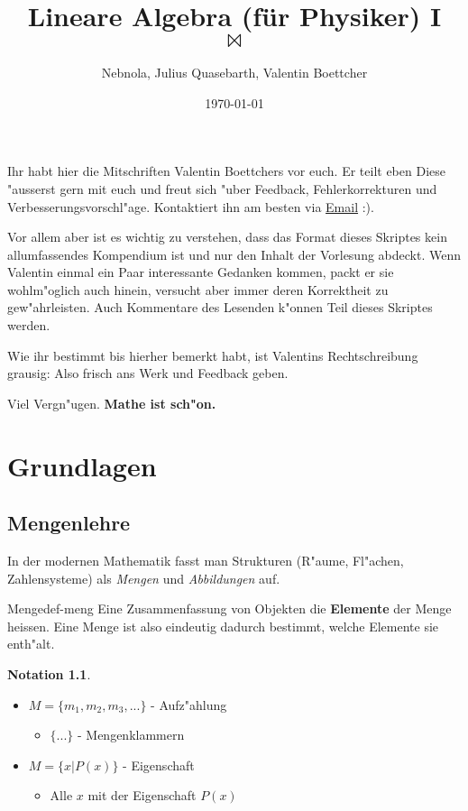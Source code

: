 \documentclass[oneside,fontsize=11pt,paper=a4,BCOR=0mm,DIV=12,automark,headsepline]{scrbook}
\author{Nebnola, Julius Quasebarth, Valentin Boettcher}
\date{\today}
\title{Lineare Algebra (für Physiker) I \\$\bowtie$}
\theoremstyle{remark}
\theoremstyle{definition}
\newtheorem*{notation}{Notation}
\theoremstyle{definition}
\theoremstyle{remark}
\begin{document}
\maketitle
\tableofcontents
\newpage
Ihr habt hier die Mitschriften Valentin Boettchers vor euch. Er teilt eben Diese
"ausserst gern mit euch und freut sich "uber Feedback, Fehlerkorrekturen und
Verbesserungsvorschl"age. Kontaktiert ihn am besten via \href{mailto:valentin.boettcher@mailbox.tu-dresden.de}{Email} :).

Vor allem aber ist es wichtig zu verstehen, dass das Format dieses Skriptes
kein allumfassendes Kompendium ist und nur den Inhalt der Vorlesung abdeckt.
Wenn Valentin einmal ein Paar interessante Gedanken kommen, packt er sie
wohlm"oglich auch hinein, versucht aber immer deren Korrektheit zu
gew"ahrleisten. Auch Kommentare des Lesenden k"onnen Teil dieses Skriptes
werden.

Wie ihr bestimmt bis hierher bemerkt habt, ist Valentins Rechtschreibung
grausig: Also frisch ans Werk und Feedback geben.


Viel Vergn"ugen. \textbf{Mathe ist sch"on.}

\part{Grundlagen}
\chapter{Mengenlehre}
\label{sec:orgd4be270}
In der modernen Mathematik fasst man Strukturen (R"aume, Fl"achen,
Zahlensysteme) als \emph{Mengen} und \emph{Abbildungen} auf.

\begin{definition}{Menge}{def-meng}
  Eine Zusammenfassung von Objekten die \textbf{Elemente} der Menge heissen. Eine Menge ist
  also eindeutig dadurch bestimmt, welche Elemente sie enth"alt.
\end{definition}

\begin{notation}\
  \begin{itemize}
  \item \(M=\{m_1,m_2,m_3,...\}\) - Aufz"ahlung
    \begin{itemize}
    \item \(\{...\}\) - Mengenklammern
    \end{itemize}
  \item \(M=\{x| P(x)\}\) - Eigenschaft
    \begin{itemize}
    \item Alle \(x\) mit der Eigenschaft \(P(x)\)
    \end{itemize}
  \end{itemize}
\end{notation}
\end{document}
